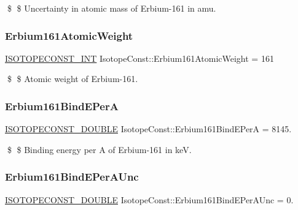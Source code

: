 \$ \$ Uncertainty in atomic mass of Erbium-\/161 in amu. \mbox{\label{group___isotope_const-_erbium-_er161_gab73a112ddda865fe17745607a7eeac86}} 
\subsubsection{\texorpdfstring{Erbium161\+Atomic\+Weight}{Erbium161AtomicWeight}}
{\footnotesize\ttfamily \mbox{\hyperlink{group___isotope_const-_macros_ga5f18360b3e99483a35c32d789e62621c}{I\+S\+O\+T\+O\+P\+E\+C\+O\+N\+S\+T\+\_\+\+I\+NT}} Isotope\+Const\+::\+Erbium161\+Atomic\+Weight = 161}

\$ \$ Atomic weight of Erbium-\/161. \mbox{\label{group___isotope_const-_erbium-_er161_gac9d29e58be517a6d5dc247ef7f14edd3}} 
\subsubsection{\texorpdfstring{Erbium161\+Bind\+E\+PerA}{Erbium161BindEPerA}}
{\footnotesize\ttfamily \mbox{\hyperlink{group___isotope_const-_macros_ga8f45a7272ce02c0b4c65c44636ed719a}{I\+S\+O\+T\+O\+P\+E\+C\+O\+N\+S\+T\+\_\+\+D\+O\+U\+B\+LE}} Isotope\+Const\+::\+Erbium161\+Bind\+E\+PerA = 8145.}

\$ \$ Binding energy per A of Erbium-\/161 in keV. \mbox{\label{group___isotope_const-_erbium-_er161_ga12dd4f008524a7c821389215ed3f572b}} 
\subsubsection{\texorpdfstring{Erbium161\+Bind\+E\+Per\+A\+Unc}{Erbium161BindEPerAUnc}}
{\footnotesize\ttfamily \mbox{\hyperlink{group___isotope_const-_macros_ga8f45a7272ce02c0b4c65c44636ed719a}{I\+S\+O\+T\+O\+P\+E\+C\+O\+N\+S\+T\+\_\+\+D\+O\+U\+B\+LE}} Isotope\+Const\+::\+Erbium161\+Bind\+E\+Per\+A\+Unc = 0.}

